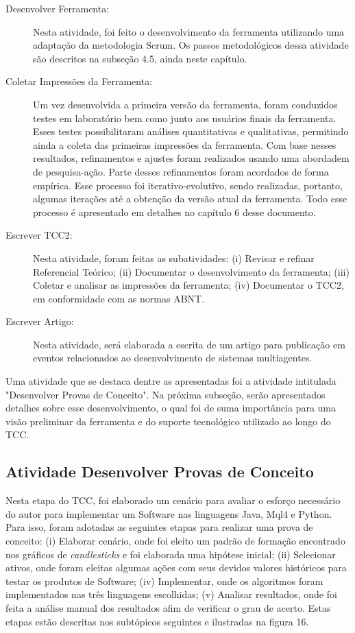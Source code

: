 \begin{description}
\item [Desenvolver Ferramenta:]
Nesta atividade, foi feito o desenvolvimento da ferramenta utilizando uma adaptação da metodologia Scrum. Os passos metodológicos dessa atividade são descritos na subseção 4.5, ainda neste capítulo.

\item [Coletar Impressões da Ferramenta:]
Um vez desenvolvida a primeira versão da ferramenta, foram conduzidos testes em laboratório bem como junto aos usuários finais da ferramenta. Esses testes possibilitaram análises quantitativas e qualitativas, permitindo ainda a coleta das primeiras impressões da ferramenta. Com base nesses resultados, refinamentos e ajustes foram realizados usando uma abordadem de pesquisa-ação. Parte desses refinamentos foram acordados de forma empírica. Esse processo foi iterativo-evolutivo, sendo realizadas, portanto, algumas iterações até a obtenção da versão atual da ferramenta. Todo esse processo é apresentado em detalhes no capítulo 6 desse documento.

\item [Escrever TCC2:] 
Nesta atividade, foram feitas as subatividades: (i) Revisar e refinar Referencial Teórico; (ii) Documentar o desenvolvimento da ferramenta; (iii) Coletar e analisar as impressões da ferramenta; (iv) Documentar o TCC2, em conformidade com as normas ABNT.

\item [Escrever Artigo:]
Nesta atividade, será elaborada a escrita de um artigo para publicação em eventos relacionados ao desenvolvimento de sistemas multiagentes.
\end{description}

Uma atividade que se destaca dentre as apresentadas foi a atividade intitulada "Desenvolver Provas de Conceito".
Na próxima subseção, serão apresentados detalhes sobre esse desenvolvimento, o qual foi de suma importância para uma visão preliminar da ferramenta e do suporte tecnológico utilizado ao longo do TCC.


\subsection{Atividade Desenvolver Provas de Conceito}

Nesta etapa do TCC, foi elaborado um cenário para avaliar o esforço necessário do autor para implementar um Software nas linguagens Java, Mql4 e Python. Para isso, foram adotadas as seguintes etapas para realizar uma prova de conceito: (i) Elaborar cenário, onde foi eleito um padrão de formação encontrado nos gráficos de \textit{candlesticks} e foi elaborada uma hipótese inicial; (ii) Selecionar  ativos, onde foram eleitas algumas ações com seus devidos valores históricos para testar os produtos de  Software; (iv) Implementar, onde os algoritmos foram implementados nas três linguagens escolhidas; (v) Analisar resultados, onde foi feita a análise manual dos resultados afim de verificar o grau de acerto. Estas etapas estão descritas nos subtópicos seguintes e ilustradas na figura 16.

